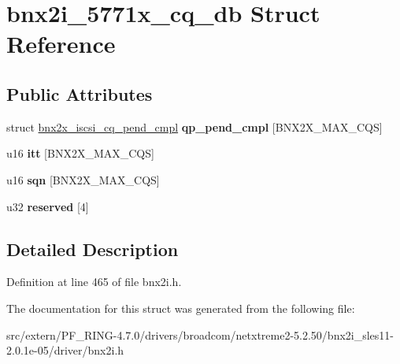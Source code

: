 \hypertarget{structbnx2i__5771x__cq__db}{
\section{bnx2i\_\-5771x\_\-cq\_\-db Struct Reference}
\label{structbnx2i__5771x__cq__db}
}
\subsection*{Public Attributes}
\begin{DoxyCompactItemize}
\item 
\hypertarget{structbnx2i__5771x__cq__db_a3b42142fa2e81a6ec0a501580b8c0c90}{
struct \hyperlink{structbnx2x__iscsi__cq__pend__cmpl}{bnx2x\_\-iscsi\_\-cq\_\-pend\_\-cmpl} {\bfseries qp\_\-pend\_\-cmpl} \mbox{[}BNX2X\_\-MAX\_\-CQS\mbox{]}}
\label{structbnx2i__5771x__cq__db_a3b42142fa2e81a6ec0a501580b8c0c90}

\item 
\hypertarget{structbnx2i__5771x__cq__db_a7bd66fd698bc6f4bda90a3855df07891}{
u16 {\bfseries itt} \mbox{[}BNX2X\_\-MAX\_\-CQS\mbox{]}}
\label{structbnx2i__5771x__cq__db_a7bd66fd698bc6f4bda90a3855df07891}

\item 
\hypertarget{structbnx2i__5771x__cq__db_a41a63d7966b6bd76bc569a6c610d47bd}{
u16 {\bfseries sqn} \mbox{[}BNX2X\_\-MAX\_\-CQS\mbox{]}}
\label{structbnx2i__5771x__cq__db_a41a63d7966b6bd76bc569a6c610d47bd}

\item 
\hypertarget{structbnx2i__5771x__cq__db_aad3c8a063978b662712a56a849fa1ecd}{
u32 {\bfseries reserved} \mbox{[}4\mbox{]}}
\label{structbnx2i__5771x__cq__db_aad3c8a063978b662712a56a849fa1ecd}

\end{DoxyCompactItemize}


\subsection{Detailed Description}


Definition at line 465 of file bnx2i.h.



The documentation for this struct was generated from the following file:\begin{DoxyCompactItemize}
\item 
src/extern/PF\_\-RING-\/4.7.0/drivers/broadcom/netxtreme2-\/5.2.50/bnx2i\_\-sles11-\/2.0.1e-\/05/driver/bnx2i.h\end{DoxyCompactItemize}
